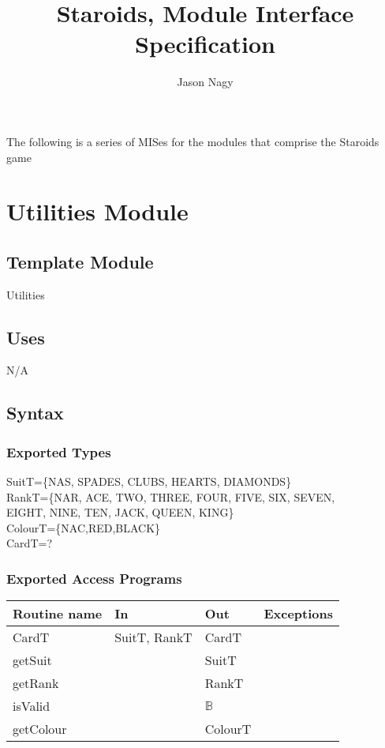 \documentclass[12pt]{article}
\title{Staroids, Module Interface Specification}
\author{Jason Nagy}
\begin{document}
\maketitle

The following is a series of MISes for the modules that comprise the Staroids game

\newpage

\section*{Utilities Module}

\subsection*{Template Module}

Utilities

\subsection*{Uses}

N/A

\subsection*{Syntax}

\subsubsection*{Exported Types}

SuitT=\{NAS, SPADES, CLUBS, HEARTS, DIAMONDS\}\\
RankT=\{NAR, ACE, TWO, THREE, FOUR, FIVE, SIX, SEVEN, \\
EIGHT, NINE, TEN, JACK, QUEEN, KING\}\\
ColourT=\{NAC,RED,BLACK\}\\
CardT=?\\

\subsubsection*{Exported Access Programs}

\begin{tabular}{| l | l | l | l |}
\hline
\textbf{Routine name} & \textbf{In} & \textbf{Out} & \textbf{Exceptions}\\
\hline
CardT & SuitT, RankT & CardT & ~\\
\hline
getSuit & ~ & SuitT & ~\\
\hline
getRank & ~ & RankT & ~\\
\hline
isValid & ~ & $\mathbb{B}$ & ~\\
\hline
getColour & ~ & ColourT & ~\\
\hline
\end{tabular}
\end{document}
